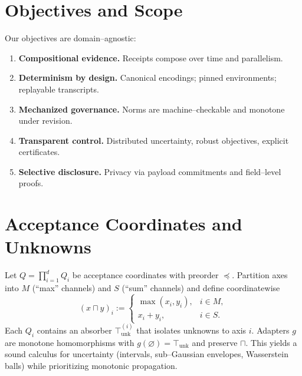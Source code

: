 \documentclass[11pt,a4paper]{article}
\numberwithin{equation}{section}
\theoremstyle{plain}
\theoremstyle{definition}
\theoremstyle{remark}
\begin{document}
\maketitle

\begin{abstract}
\noindent
We propose a research--neutral, safety--first program for verifiable computation.
Every consequential step emits a typed \receipt{} with deterministic encodings; header--only aggregation
produces a proof surface (a Merkle root) that auditors can check from bytes. Norms are specified in temporal logic and gated in CI via \smt; control is formulated as distributionally robust optimization (\dro) with level--1 optimality and conservation receipts and level--2 stability via cached \pr/\iss{} certificates with revocation. We formalize the evidence algebra, selective disclosure, mechanized governance (monotone safety), and operational obligations. The result is a practical path from assumed trust to provable trust.
\end{abstract}

\section{Objectives and Scope}
\label{sec:objectives}
Our objectives are domain--agnostic:
\begin{enumerate}[label=\textbf{O\arabic*.}]
  \item \textbf{Compositional evidence.} Receipts compose over time and parallelism.
  \item \textbf{Determinism by design.} Canonical encodings; pinned environments; replayable transcripts.
  \item \textbf{Mechanized governance.} Norms are machine--checkable and monotone under revision.
  \item \textbf{Transparent control.} Distributed uncertainty, robust objectives, explicit certificates.
  \item \textbf{Selective disclosure.} Privacy via payload commitments and field--level proofs.
\end{enumerate}

\section{Acceptance Coordinates and Unknowns}
\label{sec:acceptance}
Let $Q=\prod_{i=1}^d Q_i$ be acceptance coordinates with preorder $\preceq$. Partition axes into $M$ (``max'' channels) and $S$ (``sum'' channels) and define coordinatewise
\[
(x \sqcap y)_i :=
\begin{cases}
\max(x_i,y_i), & i\in M,\\[3pt]
x_i+y_i, & i\in S.
\end{cases}
\]
Each $Q_i$ contains an absorber $\top^{(i)}_{\text{unk}}$ that isolates unknowns to axis $i$.
Adapters $g$ are monotone homomorphisms with $g(\varnothing)=\top_{\text{unk}}$ and preserve $\sqcap$.
This yields a sound calculus for uncertainty (intervals, sub--Gaussian envelopes, Wasserstein balls) while prioritizing monotonic propagation.
\end{document}
